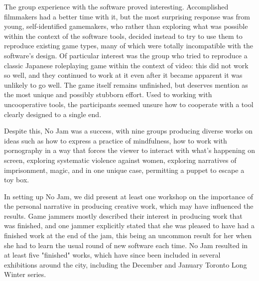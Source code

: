 The group experience with the software proved interesting. Accomplished filmmakers had a better time with it, but the most surprising response was from young, self-identified gamemakers, who rather than exploring what was possible within the context of the software tools, decided instead to try to use them to reproduce existing game types, many of which were totally incompatible with the software's design. Of particular interest was the group who tried to reproduce a classic Japanese roleplaying game within the context of video: this did not work so well, and they continued to work at it even after it became apparent it was unlikely to go well. The game itself remains unfinished, but deserves mention as the most unique and possibly stubborn effort. Used to working with uncooperative tools, the participants seemed unsure how to cooperate with a tool clearly designed to a single end. 

Despite this, No Jam was a success, with nine groups producing diverse works on ideas such as how to express a practice of mindfulness, how to work with pornography in a way that forces the viewer to interact with what's happening on screen, exploring systematic violence against women, exploring narratives of imprisonment, magic, and in one unique case, permitting a puppet to escape a toy box. 

In setting up No Jam, we did present at least one workshop on the importance of the personal narrative in producing creative work, which may have influenced the results. Game jammers mostly described their interest in producing work that was finished, and one jammer explicitly stated that she was pleased to have had a finished work at the end of the jam, this being an uncommon result for her when she had to learn the usual round of new software each time. No Jam resulted in at least five "finished" works, which have since been included in several exhibitions around the city, including the December and January Toronto Long Winter series.